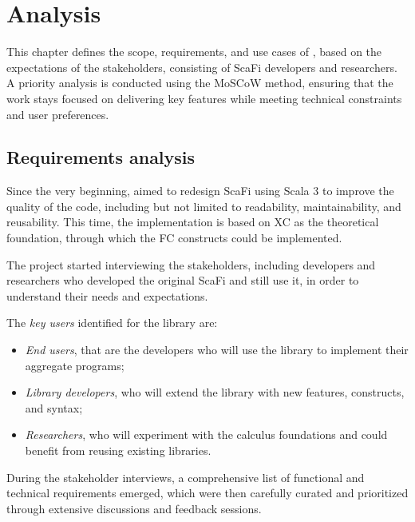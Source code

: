 \chapter{Analysis}
\label{chap:analysis}
This chapter defines the scope, requirements, and use cases of \this, based on the expectations of the stakeholders, consisting of ScaFi developers and researchers.
%
A priority analysis is conducted using the MoSCoW method, ensuring that the work stays focused on delivering key features while meeting technical constraints and user preferences.

\section{Requirements analysis} \label{chap:analysis->sec:requirement-analysis}

Since the very beginning, \this aimed to redesign ScaFi using Scala 3 to improve the quality of the code, including but not limited to readability, maintainability, and reusability.
%
This time, the implementation is based on \ac{XC} as the theoretical foundation, through which the \ac{FC} constructs could be implemented.

The project started interviewing the stakeholders, including developers and researchers who developed the original ScaFi and still use it, in order to understand their needs and expectations.

The \textit{key users} identified for the library are:
\begin{itemize}
    \item \textit{End users}, that are the developers who will use the library to implement their aggregate programs;
    \item \textit{Library developers}, who will extend the library with new features, constructs, and syntax;
    \item \textit{Researchers}, who will experiment with the calculus foundations and could benefit from reusing existing libraries.
\end{itemize}

During the stakeholder interviews, a comprehensive list of functional and technical requirements emerged, which were then carefully curated and prioritized through extensive discussions and feedback sessions.

